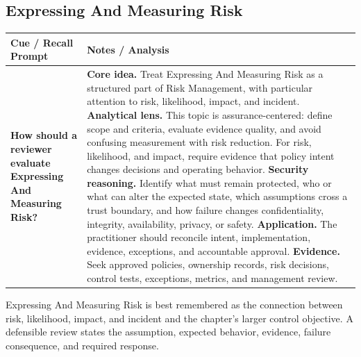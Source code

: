 \documentclass[11pt]{article}
\newcommand{\CornellHeader}{%
\rowcolor{Navy}\color{white}\bfseries Cue / Recall Prompt & \color{white}\bfseries Notes / Analysis\\\hline}
\newcommand{\CornellRow}[2]{%
\cellcolor{CueGray}\RaggedRight\textbf{#1} & \RaggedRight #2\\\hline}
\begin{document}
\subsection*{Expressing And Measuring Risk}
\begin{longtable}{>{\RaggedRight\arraybackslash}p{}|>{\RaggedRight\arraybackslash}p{}}
\CornellHeader
\CornellRow{How should a reviewer evaluate Expressing And Measuring Risk?}{\textbf{Core idea.} Treat Expressing And Measuring Risk as a structured part of Risk Management, with particular attention to risk, likelihood, impact, and incident. \textbf{Analytical lens.} This topic is assurance-centered: define scope and criteria, evaluate evidence quality, and avoid confusing measurement with risk reduction. For risk, likelihood, and impact, require evidence that policy intent changes decisions and operating behavior. \textbf{Security reasoning.} Identify what must remain protected, who or what can alter the expected state, which assumptions cross a trust boundary, and how failure changes confidentiality, integrity, availability, privacy, or safety. \textbf{Application.} The practitioner should reconcile intent, implementation, evidence, exceptions, and accountable approval. \textbf{Evidence.} Seek approved policies, ownership records, risk decisions, control tests, exceptions, metrics, and management review.}
\end{longtable}
\begin{topicsummary}
Expressing And Measuring Risk is best remembered as the connection between risk, likelihood, impact, and incident and the chapter's larger control objective. A defensible review states the assumption, expected behavior, evidence, failure consequence, and required response.
\end{topicsummary}
\end{document}
